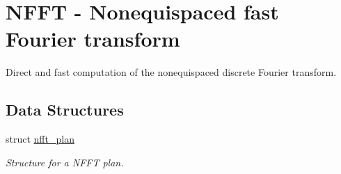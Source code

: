 \hypertarget{group__nfft}{
\section{NFFT - Nonequispaced fast Fourier transform}
\label{group__nfft}
}
Direct and fast computation of the nonequispaced discrete Fourier transform.  
\subsection*{Data Structures}
\begin{CompactItemize}
\item 
struct \hyperlink{structnfft__plan}{nfft\_\-plan}
\begin{CompactList}\small\item\em Structure for a NFFT plan. \item\end{CompactList}\end{CompactItemize}
